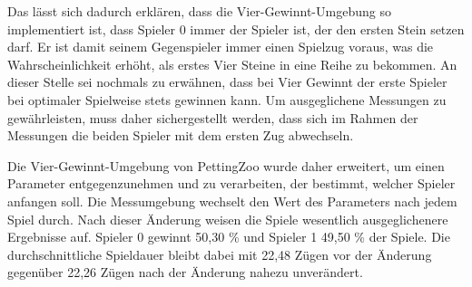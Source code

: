 Das lässt sich dadurch erklären, dass die Vier-Gewinnt-Umgebung so implementiert ist, dass Spieler 0 immer der Spieler ist, der den ersten Stein setzen darf. Er ist damit seinem Gegenspieler immer einen Spielzug voraus, was die Wahrscheinlichkeit erhöht, als erstes Vier Steine in eine Reihe zu bekommen. An dieser Stelle sei nochmals zu erwähnen, dass bei Vier Gewinnt der erste Spieler bei optimaler Spielweise stets gewinnen kann. Um ausgeglichene Messungen zu gewährleisten, muss daher sichergestellt werden, dass sich im Rahmen der Messungen die beiden Spieler mit dem ersten Zug abwechseln.

Die Vier-Gewinnt-Umgebung von PettingZoo wurde daher erweitert, um einen Parameter entgegenzunehmen und zu verarbeiten, der bestimmt, welcher Spieler anfangen soll. Die Messumgebung wechselt den Wert des Parameters nach jedem Spiel durch. Nach dieser Änderung weisen die Spiele wesentlich ausgeglichenere Ergebnisse auf. Spieler 0 gewinnt 50,30 \% und Spieler 1 49,50 \% der Spiele. Die durchschnittliche Spieldauer bleibt dabei mit 22,48 Zügen vor der Änderung gegenüber 22,26 Zügen nach der Änderung nahezu unverändert.

